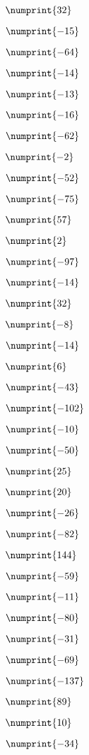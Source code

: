 {{\item$\numprint{32}$  \item$\numprint{-15}$  \item$\numprint{-64}$

\item$\numprint{-14}$  \item$\numprint{-13}$  \item$\numprint{-16}$

\item$\numprint{-62}$  \item$\numprint{-2}$  \item$\numprint{-52}$

\item$\numprint{-75}$  \item$\numprint{57}$  \item$\numprint{2}$

\item$\numprint{-97}$  \item$\numprint{-14}$  \item$\numprint{32}$

\item$\numprint{-8}$  \item$\numprint{-14}$  \item$\numprint{6}$

\item$\numprint{-43}$  \item$\numprint{-102}$  \item$\numprint{-10}$

\item$\numprint{-50}$  \item$\numprint{25}$  \item$\numprint{20}$

\item$\numprint{-26}$  \item$\numprint{-82}$  \item$\numprint{144}$

\item$\numprint{-59}$  \item$\numprint{-11}$  \item$\numprint{-80}$

\item$\numprint{-31}$  \item$\numprint{-69}$  \item$\numprint{-137}$

\item$\numprint{89}$  \item$\numprint{10}$  \item$\numprint{-34}$

}}
